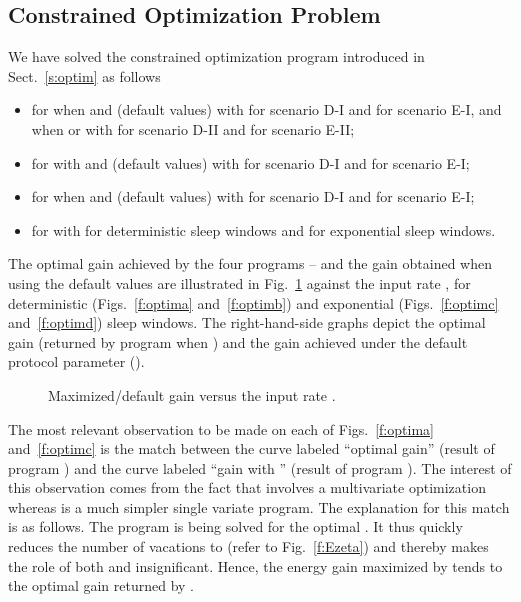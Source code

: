 \documentclass[journal]{IEEEtran}
\begin{document}
\subsection{Constrained Optimization Problem}
\label{s:ResOptim}
We have solved the constrained optimization program introduced in Sect.~\ref{s:optim} as follows
\begin{itemize}
\item  for  when  and  (default
values) with  for scenario D-I and
 for scenario E-I, and when  or  with
 for scenario D-II and  for
scenario E-II;
\item  for  with  and  (default
values) with  for scenario D-I and
 for scenario E-I;
\item  for  when  and  (default
values) with  for scenario D-I and
 for scenario E-I;
\item  for  with 
for deterministic sleep windows and  for exponential sleep windows.
\end{itemize}
The optimal gain achieved by the four programs -- and the gain obtained when using the default values are illustrated in Fig.~\ref{f:optim} against the input rate , for deterministic (Figs.~\ref{f:optima} and~\ref{f:optimb}) and exponential (Figs.~\ref{f:optimc} and~\ref{f:optimd}) sleep windows. The right-hand-side graphs depict the optimal gain (returned by program  when ) and the gain achieved under the default protocol parameter (). 
\begin{figure}[tbh]
\begin{center}
\hspace{1em}
\hspace{1em}
\hspace{1em}
\caption{Maximized/default gain versus the input rate
.\label{f:optim}}
\end{center}
\end{figure}
The most relevant observation to be made on each of Figs.~\ref{f:optima} and~\ref{f:optimc} is the match between the curve labeled ``optimal gain'' (result of program ) and the curve labeled ``gain with '' (result of program ). The interest of this observation comes from the fact that  involves a multivariate optimization whereas  is a much simpler single variate program.
The explanation for this match is as follows. The program  is being solved for the optimal . It thus quickly reduces the number of vacations  to  (refer to Fig.~\ref{f:Ezeta}) and thereby makes the role of both  and  insignificant. Hence, the energy gain maximized by  tends to the optimal gain returned by .
\end{document}
